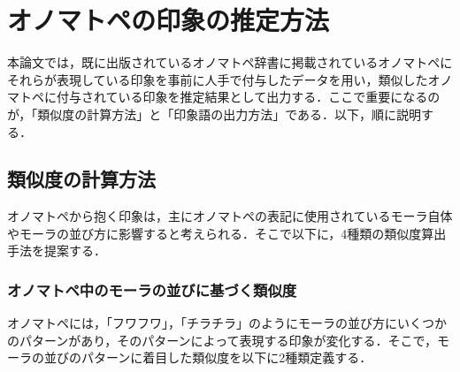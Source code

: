 \documentclass[japanese]{jnlp_1.4}
\begin{document}
\section{オノマトペの印象の推定方法}

本論文では，既に出版されているオノマトペ辞書に掲載されているオノマトペにそれらが表現している印象を事前に人手で付与したデータを用い，類似したオノマトペに付与されている印象を推定結果として出力する．ここで重要になるのが，「類似度の計算方法」と「印象語の出力方法」である．以下，順に説明する．


\subsection{類似度の計算方法}

オノマトペから抱く印象は，主にオノマトペの表記に使用されているモーラ自体やモーラの並び方に影響すると考えられる\cite{Article_05,Article_04}．そこで以下に，4種類の類似度算出手法を提案する．


\subsubsection{オノマトペ中のモーラの並びに基づく類似度}


オノマトペには，「フワフワ」，「チラチラ」のようにモーラの並び方にいくつかのパターンがあり，そのパターンによって表現する印象が変化する\cite{Article_04}．そこで，モーラの並びのパターンに着目した類似度を以下に2種類定義する．
\end{document}
